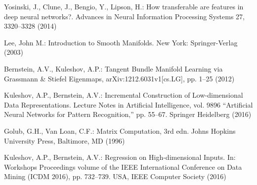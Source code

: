 \documentclass[conference]{IEEEtran} %
\begin{document}
\begin{thebibliography}{100}
Yosinski, J., Clune, J., Bengio, Y., Lipson, H.: How transferable are features in deep neural networks?.
Advances in Neural Information Processing Systems 27,
3320--3328 (2014)


Lee, John M.: Introduction to Smooth Manifolds. New York: Springer-Verlag (2003)

Bernstein, A.V., Kuleshov, A.P.: Tangent Bundle Manifold Learning via Grassmann \& Stiefel Eigenmaps, arXiv:1212.6031v1[cs.LG], pp. 1–25 (2012)

Kuleshov, A.P., Bernstein, A.V.: Incremental Construction of Low-dimensional Data Representations. Lecture Notes in Artificial Intelligence, vol. 9896 ``Artificial Neural Networks for Pattern Recognition,'' pp. 55--67. Springer Heidelberg (2016) 

Golub, G.H., Van Loan, C.F.: Matrix Computation, 3rd edn. Johns Hopkins University Press, Baltimore, MD (1996)

Kuleshov, A.P., Bernstein, A.V.: Regression on High-dimensional Inputs. In: Workshops Proceedings volume of the IEEE International Conference on Data Mining (ICDM 2016), pp. 732--739. USA, IEEE Computer Society (2016)



\end{thebibliography}
\end{document}
